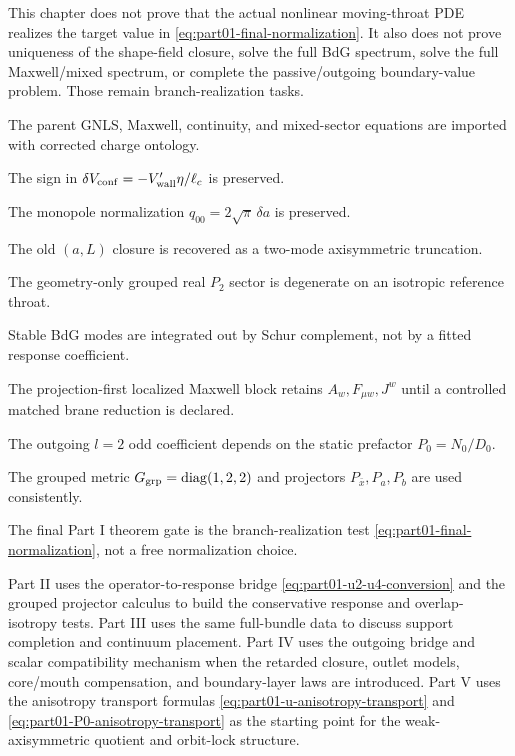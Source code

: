 This chapter does not prove that the actual nonlinear moving-throat PDE realizes the target value in \eqref{eq:part01-final-normalization}.  It also does not prove uniqueness of the shape-field closure, solve the full BdG spectrum, solve the full Maxwell/mixed spectrum, or complete the passive/outgoing boundary-value problem.  Those remain branch-realization tasks.

\begin{verificationchecklist}
\item The parent GNLS, Maxwell, continuity, and mixed-sector equations are imported with corrected charge ontology.
\item The sign in \(\delta V_{\rm conf}=-V'_{\rm wall}\eta/\ell_c\) is preserved.
\item The monopole normalization \(q_{00}=2\sqrt\pi\,\delta a\) is preserved.
\item The old \((a,L)\) closure is recovered as a two-mode axisymmetric truncation.
\item The geometry-only grouped real \(P_2\) sector is degenerate on an isotropic reference throat.
\item Stable BdG modes are integrated out by Schur complement, not by a fitted response coefficient.
\item The projection-first localized Maxwell block retains \(A_w,F_{\mu w},J^w\) until a controlled matched brane reduction is declared.
\item The outgoing \(l=2\) odd coefficient depends on the static prefactor \(P_0=N_0/D_0\).
\item The grouped metric \(G_{\rm grp}=\operatorname{diag}(1,2,2)\) and projectors \(P_{\bar x},P_a,P_b\) are used consistently.
\item The final Part I theorem gate is the branch-realization test \eqref{eq:part01-final-normalization}, not a free normalization choice.
\end{verificationchecklist}

Part II uses the operator-to-response bridge \eqref{eq:part01-u2-u4-conversion} and the grouped projector calculus to build the conservative response and overlap-isotropy tests.  Part III uses the same full-bundle data to discuss support completion and continuum placement.  Part IV uses the outgoing bridge and scalar compatibility mechanism when the retarded closure, outlet models, core/mouth compensation, and boundary-layer laws are introduced.  Part V uses the anisotropy transport formulas \eqref{eq:part01-u-anisotropy-transport} and \eqref{eq:part01-P0-anisotropy-transport} as the starting point for the weak-axisymmetric quotient and orbit-lock structure.

